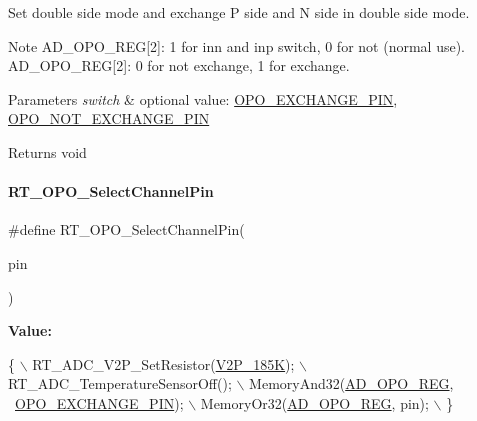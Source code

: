 Set double side mode and exchange P side and N side in double side mode. 

\begin{DoxyNote}{Note}
A\+D\+\_\+\+O\+P\+O\+\_\+\+R\+EG\mbox{[}2\mbox{]}\+: 1 for inn and inp switch, 0 for not (normal use). A\+D\+\_\+\+O\+P\+O\+\_\+\+R\+EG\mbox{[}2\mbox{]}\+: 0 for not exchange, 1 for exchange. 
\end{DoxyNote}

\begin{DoxyParams}{Parameters}
{\em switch} & optional value\+: \mbox{\hyperlink{a00002_af0663f5e9fee7a904ad95d1a4ecdaebda8866b250a87989e76add11875358e4ae}{O\+P\+O\+\_\+\+E\+X\+C\+H\+A\+N\+G\+E\+\_\+\+P\+IN}}, \mbox{\hyperlink{a00002_af0663f5e9fee7a904ad95d1a4ecdaebda4c251187b10da59c8696dbf4951b49d3}{O\+P\+O\+\_\+\+N\+O\+T\+\_\+\+E\+X\+C\+H\+A\+N\+G\+E\+\_\+\+P\+IN}} \\
\hline
\end{DoxyParams}
\begin{DoxyReturn}{Returns}
void 
\end{DoxyReturn}
\mbox{\label{a00002_aaa7081959e37104e40e3f637d42d5144}} 
\paragraph{\texorpdfstring{R\+T\+\_\+\+O\+P\+O\+\_\+\+Select\+Channel\+Pin}{RT\_OPO\_SelectChannelPin}}
{\footnotesize\ttfamily \#define R\+T\+\_\+\+O\+P\+O\+\_\+\+Select\+Channel\+Pin(\begin{DoxyParamCaption}\item[{}]{pin }\end{DoxyParamCaption})}

{\bfseries Value\+:}
\begin{DoxyCode}
\{                                               \(\backslash\)
        RT\_ADC\_V2P\_SetResistor(\mbox{\hyperlink{a00002_a80255c41c3764feff9b79664f15feb46aa035ba8725fe8565c5505a295c22ea8e}{V2P\_185K}});           \(\backslash\)
        RT\_ADC\_TemperatureSensorOff();              \(\backslash\)
        MemoryAnd32(\mbox{\hyperlink{a00020_adadaa0ab1ebbd7ba9b70dfd24c3ed44da6dc7e2b1252e5ac208ae78d9c46e8e7e}{AD\_OPO\_REG}}, ~\mbox{\hyperlink{a00002_af0663f5e9fee7a904ad95d1a4ecdaebda8866b250a87989e76add11875358e4ae}{OPO\_EXCHANGE\_PIN}}); \(\backslash\)
        MemoryOr32(\mbox{\hyperlink{a00020_adadaa0ab1ebbd7ba9b70dfd24c3ed44da6dc7e2b1252e5ac208ae78d9c46e8e7e}{AD\_OPO\_REG}}, pin);                \(\backslash\)
    \}
\end{DoxyCode}


